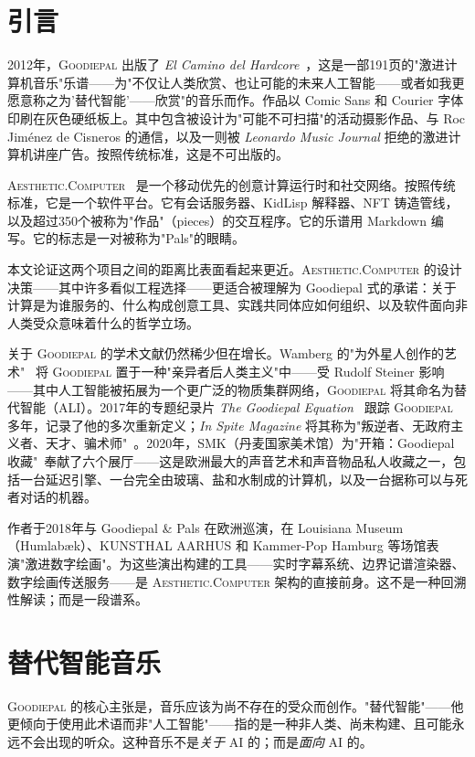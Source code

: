 \documentclass[10pt,letterpaper,twocolumn]{article}
\newcommand{\ac}{\textsc{Aesthetic.Computer}}
\newcommand{\gp}{\textsc{Goodiepal}}
\begin{document}
\section{引言}

2012年，\gp{} 出版了 \emph{El Camino del Hardcore}~\citep{goodiepal2012elcamino}，这是一部191页的"激进计算机音乐"乐谱——为"不仅让人类欣赏、也让可能的未来人工智能——或者如我更愿意称之为'替代智能'——欣赏"的音乐而作。作品以 Comic Sans 和 Courier 字体印刷在灰色硬纸板上。其中包含被设计为"可能不可扫描"的活动摄影作品、与 Roc Jim\'enez de Cisneros 的通信，以及一则被 \emph{Leonardo Music Journal} 拒绝的激进计算机讲座广告。按照传统标准，这是不可出版的。

\ac{}~\citep{scudder2026ac} 是一个移动优先的创意计算运行时和社交网络。按照传统标准，它是一个软件平台。它有会话服务器、KidLisp 解释器、NFT 铸造管线，以及超过350个被称为"作品"（pieces）的交互程序。它的乐谱用 Markdown 编写。它的标志是一对被称为"Pals"的眼睛。

本文论证这两个项目之间的距离比表面看起来更近。\ac{} 的设计决策——其中许多看似工程选择——更适合被理解为 Goodiepal 式的承诺：关于计算是为谁服务的、什么构成创意工具、实践共同体应如何组织、以及软件面向非人类受众意味着什么的哲学立场。

关于 \gp{} 的学术文献仍然稀少但在增长。Wamberg 的"为外星人创作的艺术"~\citep{wamberg2022artforaliens} 将 \gp{} 置于一种"亲异者后人类主义"中——受 Rudolf Steiner 影响——其中人工智能被拓展为一个更广泛的物质集群网络，\gp{} 将其命名为替代智能（ALI）。2017年的专题纪录片 \emph{The Goodiepal Equation}~\citep{sanpakkila2017equation} 跟踪 \gp{} 多年，记录了他的多次重新定义；\emph{In Spite Magazine} 将其称为"叛逆者、无政府主义者、天才、骗术师"~\citep{inspite2024goodiepal}。2020年，SMK（丹麦国家美术馆）为"开箱：Goodiepal 收藏"~\citep{smk2020unboxing}奉献了六个展厅——这是欧洲最大的声音艺术和声音物品私人收藏之一，包括一台延迟引擎、一台完全由玻璃、盐和水制成的计算机，以及一台据称可以与死者对话的机器。

作者于2018年与 Goodiepal \& Pals 在欧洲巡演，在 Louisiana Museum（Humlab\ae k）、KUNSTHAL AARHUS 和 Kammer-Pop Hamburg 等场馆表演"激进数字绘画"。为这些演出构建的工具——实时字幕系统、边界记谱渲染器、数字绘画传送服务——是 \ac{} 架构的直接前身。这不是一种回溯性解读；而是一段谱系。

\section{替代智能音乐}

\gp{} 的核心主张是，音乐应该为尚不存在的受众而创作。"替代智能"——他更倾向于使用此术语而非"人工智能"——指的是一种非人类、尚未构建、且可能永远不会出现的听众。这种音乐不是\emph{关于} AI 的；而是\emph{面向} AI 的。
\end{document}
